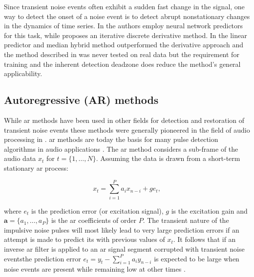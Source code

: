 Since transient noise events often exhibit a sudden fast change in the signal, one way to detect the onset of a noise event is to detect abrupt nonstationary changes in the dynamics of time series. In \cite{Fancourt2000} the authors employ neural network predictors for this task, while \cite{Kauppinen2002} proposes an iterative discrete derivative method. In \cite{Kauppinen2002} the linear predictor and median hybrid method outperformed the derivative approach and the method described in \cite{Fancourt2000} was never tested on real data but the requirement for training and the inherent detection deadzone does reduce the method's general applicability.

\subsection{Autoregressive (AR) methods}\label{sec:LitRevAR}
While \DIFdelbegin {}\DIFdelend \DIFaddbegin \gls{ar} \DIFaddend methods have been used in other fields for detection and restoration of transient noise events \cite{Arakawa1986}\DIFaddbegin \DIFadd{, }\DIFaddend these methods were generally pioneered in the field of audio processing in \cite{Vaseghi1988thesis}\cite{Vaseghi1988}\cite{Vaseghi1990}. \DIFdelbegin {}\DIFdelend \DIFaddbegin \gls{ar} \DIFaddend methods are today the basis for many pulse detection algorithms in audio applications \cite{Karjalainen1997}\cite{Esquef2000}\cite{Haermae2000}\cite{Esquef2002}\cite{Kauppinen2002}\cite{Wolfe2005}\cite{Subramanya2007}. The \DIFdelbegin {}\DIFdelend \DIFaddbegin \gls{ar} \DIFaddend method considers a sub-frame of the audio data $x_t$ for $ t = \{ 1, \ldots, N \}$. Assuming the data is drawn from a short-term stationary \DIFdelbegin {}\DIFdelend \DIFaddbegin \gls{ar} \DIFaddend process:

\begin{equation}\label{eq:ARmodel}
x_t = \sum_{i=1}^P a_i x_{n-i} + ge_t,
\end{equation}

where $e_t$ is the prediction error (or excitation signal), $g$ is the excitation gain and $\mathbf{a} = \{a_1,\ldots,a_P\}$ is the \DIFdelbegin {}\DIFdelend \DIFaddbegin \gls{ar} \DIFaddend coefficients of order $P$. The transient nature of the impulsive noise pulses will most likely lead to very large prediction errors if an attempt is made to predict its \DIFdelbegin {}\DIFdelend \DIFaddbegin {}\DIFaddend with previous values of $x_t$. It follows that if an inverse \DIFdelbegin {}\DIFdelend \DIFaddbegin \gls{ar} \DIFaddend filter is applied to an \DIFdelbegin {}\DIFdelend \DIFaddbegin \gls{ar} \DIFaddend signal segment corrupted with transient noise events\DIFdelbegin {}\DIFdelend \DIFaddbegin {}\DIFaddend the prediction error $e_t = y_t - \sum_{i=1}^P a_i y_{n-i}$ is expected to be large when noise events are present while remaining low at other times \cite{Godsill1998book}.

